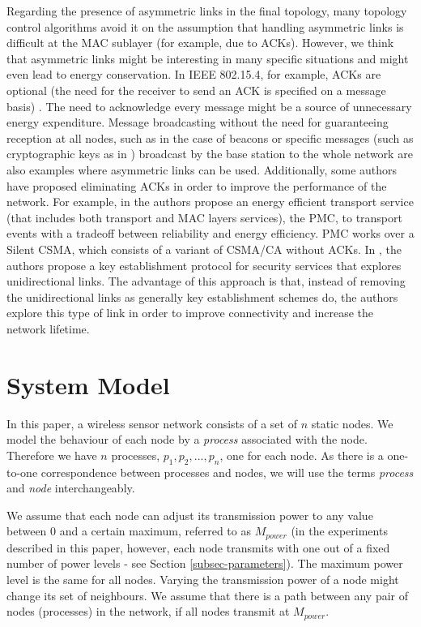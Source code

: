 \documentclass{llncs}
\begin{document}
Regarding the presence of asymmetric links in the final topology, many topology control algorithms avoid it on the assumption that handling asymmetric links is difficult at the MAC
sublayer (for example, due to ACKs). However, we think that asymmetric links might be interesting in many specific situations and might even lead to energy conservation. 
In IEEE 802.15.4, for example, ACKs are optional (the need for the receiver to send an ACK is specified on a message basis) \cite{Society2006}. 
The need to acknowledge every message might be a source of unnecessary energy expenditure. Message broadcasting without
the need for guaranteeing reception at all nodes, such as in the case of beacons or specific messages (such as cryptographic keys as in \cite{deng02}) broadcast by the
base station to the whole network are also examples where asymmetric links can be used. Additionally, some authors have proposed eliminating ACKs in order to improve the 
performance of the network. For example, in \cite{Wu-X2006} the authors propose an energy efficient transport service (that includes both transport and MAC layers services), the PMC,  to transport events with a tradeoff between reliability and energy efficiency. PMC works over a Silent CSMA, which consists of a variant of CSMA/CA without ACKs. 
In \cite{ZhangY2008}, the authors propose a key establishment protocol for security services 
that explores unidirectional links. The advantage of this approach is that, instead of removing the unidirectional links as generally key establishment schemes do, 
the authors explore this type of link in order to improve connectivity and increase the network lifetime. 

\section{System Model}
\label{sec-system-model}

In this paper, a wireless sensor network consists of a set of $n$ static nodes. We model the behaviour
of each node by a \emph{process} associated with the node. Therefore we have $n$ processes, 
$p_1, p_2, ..., p_n$, one for each node. As there is a one-to-one correspondence between processes 
and nodes, we will use the terms \emph{process} and \emph{node} interchangeably.

We assume that each node can adjust its transmission power to any value between 0 and a certain 
maximum, referred to as $M_{power}$ (in the experiments described in this paper, however, each node transmits with one out of a
fixed number of power levels - see Section \ref{subsec-parameters}). The maximum power level is the same for
all nodes. Varying the transmission power of a node might change its set of neighbours. 
We assume that there is a path between any pair of nodes (processes) 
in the network, if all nodes transmit at $M_{power}$. 
\end{document}
